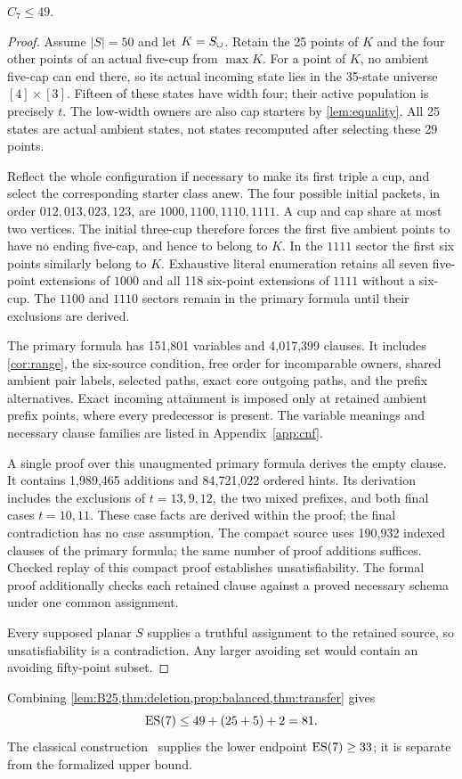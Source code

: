 \begin{proposition}\label{prop:balanced}
$C_7\le49$.
\end{proposition}
\begin{proof}
Assume $|S|=50$ and let $K=S_{\cup}$. Retain the 25 points of $K$ and
the four other points of an actual five-cup from $\max K$. For a point
of $K$, no ambient five-cap can end there, so its actual incoming
state lies in the 35-state universe $[4]\times[3]$. Fifteen of these
states have width four; their active population is precisely $t$.
The low-width owners are also cap starters by \cref{lem:equality}.
All 25 states are actual ambient states, not states recomputed after
selecting these 29 points.

Reflect the whole configuration if necessary to make its first triple
a cup, and select the corresponding starter class anew. The four
possible initial packets, in order $012,013,023,123$, are
$1000,1100,1110,1111$. A cup and cap share at most two vertices.
The initial three-cup therefore forces the first five ambient points
to have no ending five-cap, and hence to belong to $K$. In the $1111$
sector the first six points similarly belong to $K$. Exhaustive
literal enumeration retains all seven five-point extensions of $1000$
and all 118 six-point extensions of $1111$ without a six-cup.
The $1100$ and $1110$ sectors remain in the primary formula until
their exclusions are derived.

The primary formula has 151,801 variables and 4,017,399 clauses. It includes \cref{cor:range}, the six-source condition,
free order for incomparable owners, shared ambient pair labels,
selected paths, exact core outgoing paths, and the prefix alternatives.
Exact incoming attainment is imposed only at retained ambient prefix
points, where every predecessor is present. The variable meanings
and necessary clause families are listed in Appendix~\ref{app:cnf}.

A single proof over this unaugmented primary formula derives the empty
clause. It contains 1,989,465 additions and 84,721,022 ordered hints.
Its derivation includes the exclusions of $t=13,9,12$, the two mixed
prefixes, and both final cases $t=10,11$. These case facts are derived
within the proof; the final contradiction has no case assumption.
The compact source uses 190,932 indexed clauses of the primary formula;
the same number of proof additions suffices. Checked replay of
this compact proof establishes unsatisfiability. The formal proof additionally checks each retained clause against a
proved necessary schema under one common assignment.

Every supposed planar $S$ supplies a truthful assignment to the
retained source, so unsatisfiability is a contradiction. Any larger
avoiding set would contain an avoiding fifty-point subset.
\end{proof}

Combining \cref{lem:B25,thm:deletion,prop:balanced,thm:transfer} gives
\[
 \operatorname{ES}(7)\le49+(25+5)+2=81.
\]
The classical construction~\cite{ES61} supplies the lower endpoint
$\operatorname{ES}(7)\ge33$; it is separate from the formalized upper bound.
